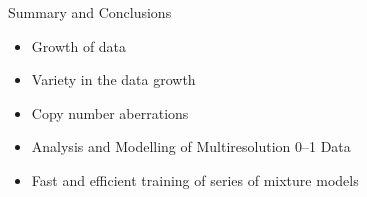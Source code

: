 \documentclass[first=dgreen,second=purple,logo=redexc]{aaltoslides}
\newcommand\FrameText[1]{%
  \begin{textblock*}{0.98\textwidth}(0.2\textwidth,0.95\textheight)
    \textcolor {red}{\scriptsize\raggedright #1\hspace{0.1\textwidth}}
  \end{textblock*}}
\begin{document}
% 
%       
%       
% 


% 
%       
% 
% 


% 
%       
% 

\begin{frame}{Summary and Conclusions}

\begin{itemize} \setlength{\itemsep}{5.5mm}
 \item Growth of data
  \item Variety in the data growth
  \item Copy number aberrations 
  \item Analysis and Modelling of Multiresolution 0--1 Data
 \item Fast and efficient training of series of mixture models
\end{itemize}
\end{frame}
\end{document}
